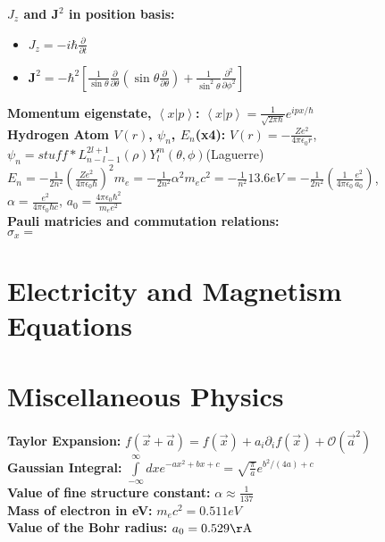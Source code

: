 \documentclass[12pt]{extarticle}
\newcommand{\braket}[2]{\left< #1 | #2 \right>}
\begin{document}
\textbf{$J_z$ and $\mathbf{J}^2$ in position basis:}
\begin{itemize}
  \item $J_z = -i\hbar \frac{\partial}{\partial t}$
  \item $\mathbf{J}^2 = -\hbar^2\left[ \frac{1}{\sin\theta}\frac{\partial}{\partial\theta}\left(\sin\theta\frac{\partial}{\partial\theta}\right) + \frac{1}{\sin^2\theta}\frac{\partial^2}{\partial\phi^2} \right]$
\end{itemize}
\textbf{Momentum eigenstate, $\braket{x}{p}$:} $\braket{x}{p} = \frac{1}{\sqrt{2\pi\hbar}}e^{ipx/\hbar}$ \\
\textbf{Hydrogen Atom $V(r)$, $\psi_n$, $E_n$(x4):} $V(r) = -\frac{Ze^2}{4\pi\epsilon_0r}$, $\psi_n = stuff*L^{2l+1}_{n-l-1}(\rho)Y_l^m(\theta,\phi)$(Laguerre) \\
$E_n = -\frac{1}{2n^2}\left(\frac{Ze^2}{4\pi\epsilon_0\hbar}\right)^2m_e = -\frac{1}{2n^2}\alpha^2m_e c^2 = -\frac{1}{n^2}13.6eV = -\frac{1}{2n^2}\left(\frac{1}{4\pi\epsilon_0}\frac{e^2}{a_0}\right)$, \\
$\alpha = \frac{e^2}{4\pi\epsilon_0\hbar c}$, $a_0 = \frac{4\pi\epsilon_0\hbar^2}{m_ee^2}$ \\
\textbf{Pauli matricies and commutation relations:} \\
$\sigma_x = $

\section{Electricity and Magnetism Equations}

\section{Miscellaneous Physics}
\textbf{Taylor Expansion:} $f(\vec{x}+\vec{a}) = f(\vec{x}) + a_i\partial_i f(\vec{x}) + \mathcal{O}(\vec{a}^2)$ \\
\textbf{Gaussian Integral:} $\int\limits_{-\infty}^\infty dx e^{-ax^2+bx+c} = \sqrt{\frac{\pi}{a}}e^{b^2/(4a)+c}$ \\
\textbf{Value of fine structure constant:} $\alpha \approx \frac{1}{137}$ \\
\textbf{Mass of electron in eV:} $m_ec^2 = 0.511 eV$ \\
\textbf{Value of the Bohr radius:} $a_0 = 0.529 \mathrm{\AA}$ \\
\end{document}
